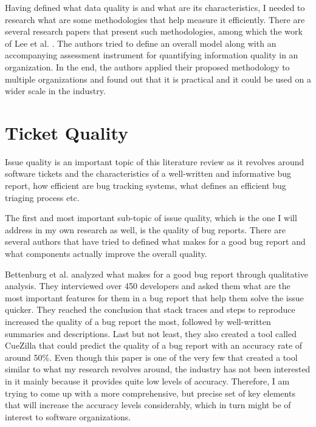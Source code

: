 \documentclass[11pt,english,twocolumn]{article}
\begin{document}
Having defined what data quality is and what are its characteristics, I needed
to research what are some methodologies that help measure it efficiently.
There are several research papers that present such methodologies, among which the 
work of Lee et al. \cite{lee2002aimq}. The authors tried to define an overall model along 
with an accompanying assessment instrument for quantifying information quality 
in an organization. In the end, the authors applied their proposed methodology 
to multiple organizations and found out that it is practical and it could be used 
on a wider scale in the industry.

\section{Ticket Quality}
\label{sec:ticket-quality}

Issue quality is an important topic of this literature review as it revolves around
software tickets and the characteristics of a well-written and 
informative bug report, how efficient are bug tracking systems, what defines
an efficient bug triaging process etc. 

The first and most important sub-topic of issue quality, which is the one
I will address in my own research as well, is the quality of bug reports.
There are several authors that have tried to defined what makes for a good bug
report and what components actually improve the overall quality.

Bettenburg et al. \cite{bettenburg2008makes} analyzed what 
makes for a good bug report through qualitative analysis. They interviewed over
450 developers and asked them what are the most important features for them in
a bug report that help them solve the issue quicker. They reached the conclusion 
that stack traces and steps to reproduce increased the quality of a bug report 
the most, followed by well-written summaries and 
descriptions. Last but not least, they also created a tool called CueZilla that 
could predict the quality of a bug report with an accuracy rate of around 50\%.
Even though this paper is one of the very few that created a tool
similar to what my research revolves around, the industry has not been interested
in it mainly because it provides quite low levels of accuracy. Therefore, I am trying
to come up with a more comprehensive, but precise set of key elements that will 
increase the accuracy levels considerably, which in turn might be of interest to 
software organizations.
\end{document}

